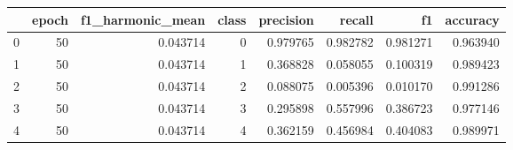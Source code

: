 \begin{tabular}{lrrrrrrr}
\toprule
 & epoch & f1_harmonic_mean & class & precision & recall & f1 & accuracy \\
\midrule
0 & 50 & 0.043714 & 0 & 0.979765 & 0.982782 & 0.981271 & 0.963940 \\
1 & 50 & 0.043714 & 1 & 0.368828 & 0.058055 & 0.100319 & 0.989423 \\
2 & 50 & 0.043714 & 2 & 0.088075 & 0.005396 & 0.010170 & 0.991286 \\
3 & 50 & 0.043714 & 3 & 0.295898 & 0.557996 & 0.386723 & 0.977146 \\
4 & 50 & 0.043714 & 4 & 0.362159 & 0.456984 & 0.404083 & 0.989971 \\
\bottomrule
\end{tabular}
